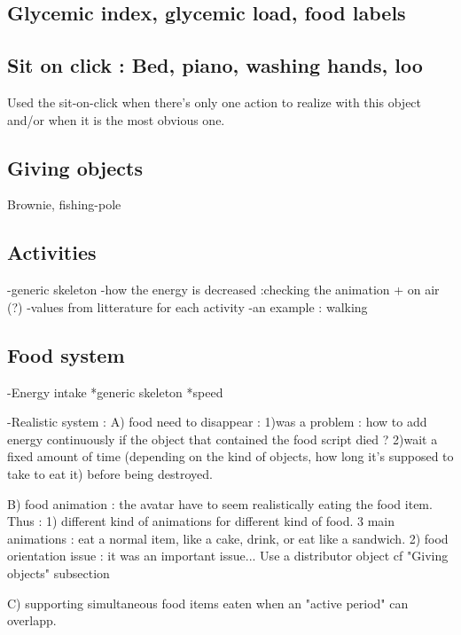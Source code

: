 \subsection{}
\subsection{Glycemic index, glycemic load, food labels}

\subsection{Sit on click : Bed, piano, washing hands, loo}
Used the sit-on-click when there's only one action to realize with this object and/or when it is the most obvious one.


\subsection{Giving objects}
Brownie, fishing-pole


\subsection{Activities}
-generic skeleton
-how the energy is decreased :checking the animation + on air (?)
-values from litterature for each activity
-an example : walking

\subsection{Food system}
-Energy intake
    *generic skeleton
    *speed
    
-Realistic system :
    A) food need to disappear : 
        1)was a problem : how to add energy continuously if the object that contained the food script died ? 
        2)wait a fixed amount of time (depending on the kind of objects, how long it's supposed to take to eat it) before being destroyed.
        
    B) food animation : the avatar have to seem realistically eating the food item. Thus :
        1) different kind of animations for different kind of food. 3 main animations : eat a normal item, like a cake, drink, or eat like a sandwich.
        2) food orientation issue : it was an important issue... Use a distributor object cf "Giving objects" subsection
    
    C) supporting simultaneous food items eaten when an "active period" can overlapp.
        
